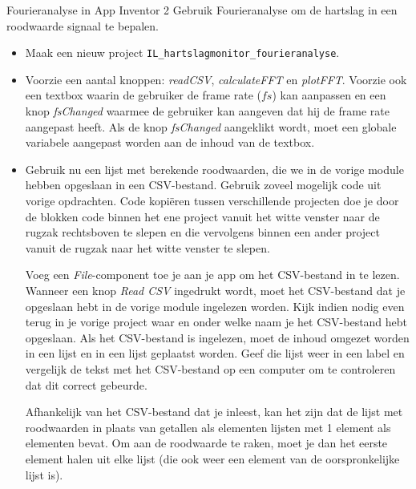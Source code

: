 \begin{opdracht}{Fourieranalyse in App Inventor 2}
Gebruik Fourieranalyse om de hartslag in een roodwaarde signaal te bepalen.
	
\begin{itemize}
	
	\item Maak een nieuw project \texttt{IL\_hartslagmonitor\_fourieranalyse}.
	
	\item Voorzie een aantal knoppen: \emph{readCSV}, \emph{calculateFFT} en \emph{plotFFT}. Voorzie ook een textbox waarin de gebruiker de frame rate ($fs$) kan aanpassen en een knop \emph{fsChanged} waarmee de gebruiker kan aangeven dat hij de frame rate aangepast heeft. Als de knop \emph{fsChanged} aangeklikt wordt, moet een globale variabele aangepast worden aan de inhoud van de textbox.
	
	\item Gebruik nu een lijst met berekende roodwaarden, die we in de vorige module hebben opgeslaan in een CSV-bestand. Gebruik zoveel mogelijk code uit vorige opdrachten. Code kopi\"eren tussen verschillende projecten doe je door de blokken code binnen het ene project vanuit het witte venster naar de rugzak rechtsboven te slepen en die vervolgens binnen een ander project vanuit de rugzak naar het witte venster te slepen.
	
	Voeg een \emph{File}-component toe je aan je app om het CSV-bestand in te lezen. Wanneer een knop \emph{Read CSV} ingedrukt wordt, moet het CSV-bestand dat je opgeslaan hebt in de vorige module ingelezen worden. Kijk indien nodig even terug in je vorige project waar en onder welke naam je het CSV-bestand hebt opgeslaan. Als het CSV-bestand is ingelezen, moet de inhoud omgezet worden in een lijst en in een lijst geplaatst worden. Geef die lijst weer in een label en vergelijk de tekst met het CSV-bestand op een computer om te controleren dat dit correct gebeurde. 
	
	\begin{opmerking}
		Afhankelijk van het CSV-bestand dat je inleest, kan het zijn dat de lijst met roodwaarden in plaats van getallen als elementen lijsten met 1 element als elementen bevat. Om aan de roodwaarde te raken, moet je dan het eerste element halen uit elke lijst (die ook weer een element van de oorspronkelijke lijst is).
		
	\end{opmerking}
	

\end{itemize}
\end{opdracht}
